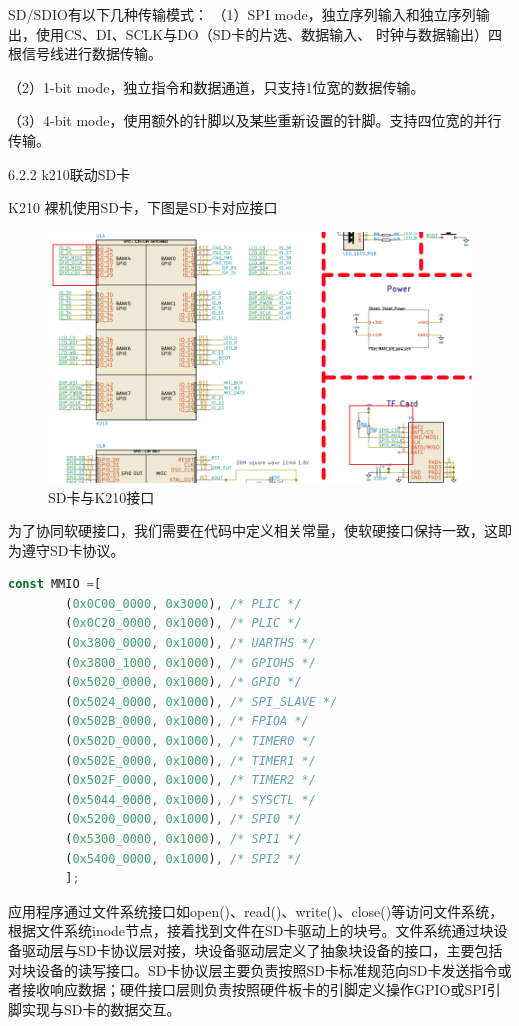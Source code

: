 SD/SDIO有以下几种传输模式：
（1）SPI mode，独立序列输入和独立序列输出，使⽤CS、DI、SCLK与DO（SD卡的片选、数据输入、
时钟与数据输出）四根信号线进行数据传输。

（2）1-bit mode，独立指令和数据通道，只支持1位宽的数据传输。

（3）4-bit mode，使用额外的针脚以及某些重新设置的针脚。支持四位宽的并行传输。

6.2.2 k210联动SD卡

K210 裸机使用SD卡，下图是SD卡对应接口
\begin{figure}[H]
    \centering
    \includegraphics{figures/06-02-接口标.png}
    \caption{SD卡与K210接口}
\end{figure}

为了协同软硬接口，我们需要在代码中定义相关常量，使软硬接口保持一致，这即为遵守SD卡协议。
\begin{lstlisting}[language={Rust}, label={code:inode},
	caption={SD卡协议}]
    const MMIO =[
        (0x0C00_0000, 0x3000), /* PLIC */
        (0x0C20_0000, 0x1000), /* PLIC */
        (0x3800_0000, 0x1000), /* UARTHS */
        (0x3800_1000, 0x1000), /* GPIOHS */
        (0x5020_0000, 0x1000), /* GPIO */
        (0x5024_0000, 0x1000), /* SPI_SLAVE */
        (0x502B_0000, 0x1000), /* FPIOA */
        (0x502D_0000, 0x1000), /* TIMER0 */
        (0x502E_0000, 0x1000), /* TIMER1 */
        (0x502F_0000, 0x1000), /* TIMER2 */
        (0x5044_0000, 0x1000), /* SYSCTL */
        (0x5200_0000, 0x1000), /* SPI0 */
        (0x5300_0000, 0x1000), /* SPI1 */
        (0x5400_0000, 0x1000), /* SPI2 */
        ];
\end{lstlisting}


应用程序通过文件系统接口如open()、read()、write()、close()等访问文件系统，根据文件系统inode节点，接着找到文件在SD卡驱动上的块号。文件系统通过块设备驱动层与SD卡协议层对接，块设备驱动层定义了抽象块设备的接口，主要包括对块设备的读写接口。SD卡协议层主要负责按照SD卡标准规范向SD卡发送指令或者接收响应数据；硬件接口层则负责按照硬件板卡的引脚定义操作GPIO或SPI引脚实现与SD卡的数据交互。

